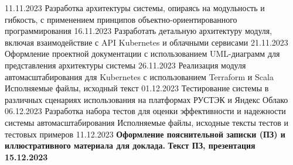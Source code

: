 {%
      {}
%
      {11.11.2023}{}
    \projecttask{\projectsubtasknum}
      {Разработка архитектуры системы, опираясь на модульность и гибкость, с
применением принципов объектно-ориентированного программирования}
%
      {}
%
      {16.11.2023}{}
    \projecttask{\projectsubtasknum}
      {Разработать детальную архитектуру модуля, включая взаимодействие с API
Kubernetes и облачными сервисами}
%
      {}
%
      {21.11.2023}{}
    \projecttask{\projectsubtasknum}
      {Оформление проектной документации с использованием UML-диаграмм для
представления архитектуры системы}
%
      {}
%
      {26.11.2023}{}
    \projecttask{\projectsubtasknum}
      {Реализация модуля автомасштабирования для Kubernetes с использованием
Terraform и Scala}
%
      {Исполняемые файлы, исходный текст}
%
      {01.12.2023}{}
    \projecttask{\projectsubtasknum}
      {Тестирование системы в различных сценариях использования на платформах
РУСТЭК и Яндекс Облако}
%
      {}
%
      {06.12.2023}{}
    \projecttask{\projectsubtasknum}
      {Разработка набора тестов для оценки эффективности и надежности системы
автомасштабирования}
%
      {Исполняемые файлы, исходные тексты тестов и тестовых примеров}
%
      {11.12.2023}{}
  \projecttask{\bfseries\projecttasknum}
    {\bfseries Оформление пояснительной записки (ПЗ) и иллюстративного материала
для доклада.}
%
    {\bfseries Текст ПЗ, презентация}
%
    {\bfseries 15.12.2023}{}
}

\taskliterature{
  \nocite{pierce-types-2012-ru}
  \nocite{wolfengagen-methods-2008}
  \nocite{wolfengagen-combinatory-2008}
  \nocite{shapkin-automation-2022}
  \nocite{bernstein-containers-2014}
  \nocite{cats}
  \nocite{cats-effect}
  \nocite{iaas2017}
  \nocite{kubectl}
  \nocite{howard2022terraform}
  \nocite{carrion2022kubernetes}
  \nocite{turin2023predicting}
  \nocite{bijon2014formal}
  \nocite{amato2018improving}
  \nocite{de2012formal}
  \nocite{bohm2021profiling}
}


